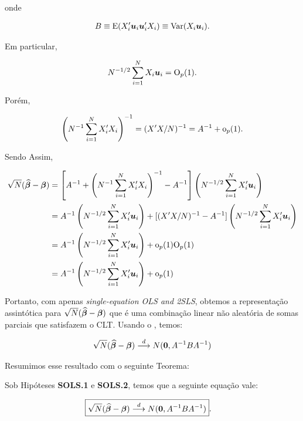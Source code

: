 \documentclass[11pt, oneside, a4paper, article]{article}
\numberwithin{equation}{section}
\begin{document}
\noindent
onde

\vspace{-1 em}
\begin{align*} 
B \equiv \text{E}(X_{i}' \boldsymbol{u}_{i} \boldsymbol{u}_{i}' X_{i}) \equiv \text{Var}(X_{i} \boldsymbol{u}_{i}).
\end{align*}

\noindent
Em particular,

\vspace{-1 em}
\begin{align*} 
N^{-1/2} \sum_{i=1}^{N} X_{i} \boldsymbol{u}_{i} = \text{O}_{p}(1).
\end{align*}

Porém,

\vspace{-1 em}
\begin{align*} 
	\left( N^{-1} \sum_{i=1}^{N} X_{i}' X_{i} \right)^{-1} = (X'X/N)^{-1} = A^{-1} + \text{o}_{p}(1).
\end{align*}

\noindent
Sendo Assim,

\vspace{-1 em}
\begin{align*} 
\sqrt{N}(\widehat{\boldsymbol{\beta}} - \boldsymbol{\beta}) &= 
\left[ 
A^{-1} +
\left( N^{-1} \sum_{i=1}^{N} X_{i}' X_{i}   \right)^{-1}
- A^{-1}
\right]
\left( N^{-1/2} \sum_{i=1}^{N} X_{i}' \boldsymbol{u}_{i}   \right)
\\ &=
A^{-1}\left( N^{-1/2} \sum_{i=1}^{N} X_{i}' \boldsymbol{u}_{i}   \right)
+
[(X'X/N)^{-1} - A^{-1}]
\left( N^{-1/2} \sum_{i=1}^{N} X_{i}' \boldsymbol{u}_{i}   \right)
\\&=
A^{-1}\left( N^{-1/2} \sum_{i=1}^{N} X_{i}' \boldsymbol{u}_{i}   \right)
+ \text{o}_{p}(1) \text{O}_{p}(1)
\\&=
A^{-1}\left( N^{-1/2} \sum_{i=1}^{N} X_{i}' \boldsymbol{u}_{i}   \right)
+ \text{o}_{p}(1)
\end{align*}

Portanto, com apenas \textit{single-equation OLS and 2SLS}, obtemos a representação assintótica para $\sqrt{N}(\widehat{\boldsymbol{\beta}} - \boldsymbol{\beta})$ que é uma combinação linear não aleatória de somas parciais que satisfazem o CLT.
Usando o , temos:

\begin{align*} 
\sqrt{N}(\widehat{\boldsymbol{\beta}} - \boldsymbol{\beta})
 \overset{d}{\longrightarrow} 
N(\boldsymbol{0}, A^{-1} B A^{-1})
\end{align*}

Resumimos esse resultado com o seguinte Teorema:

\begin{teo1}\label{teo:sols:norm}
Sob Hipóteses \textbf{SOLS.1} e \textbf{SOLS.2}, temos que a seguinte equação vale:

\begin{align} \label{eq:sols:norm}
	\Aboxed{
\sqrt{N}(\betahatbold - \betavec)
\arrowd
N(\mbs{0}, A^{-1} B A^{-1})
}.
\end{align}
\end{teo1}
\end{document}
